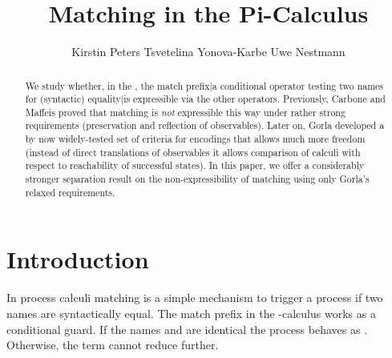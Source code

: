 \documentclass[final,copyright,creativecommons]{eptcs}
\title{Matching in the Pi-Calculus}
\author{Kirstin Peters \qquad\qquad Tsvetelina Yonova-Karbe \qquad\qquad Uwe Nestmann
\institute{TU Berlin, Germany}}
\begin{document}
\maketitle



\begin{abstract}
	We study whether, in the \piCal, the {match prefix}|{a} conditional operator testing two names for (syntactic) {equality}|{is} expressible via the other operators.
	Previously, Carbone and Maffeis proved that matching is \emph{not} expressible this way under rather strong requirements (preservation and reflection of observables).
	Later on, Gorla developed a by now widely-tested set of criteria for encodings that allows much more freedom (\eg instead of direct translations of observables it allows comparison of calculi with respect to reachability of successful states).
    In this paper, we offer a considerably stronger separation result on the non-expressibility of matching using only Gorla's relaxed requirements.
\end{abstract}



\section{Introduction}

In process calculi matching is a simple mechanism to trigger a process if two names are syntactically equal. The match prefix  in the -calculus works as a conditional guard. If the names  and  are identical the process behaves as . Otherwise, the term cannot reduce further.
\end{document}
